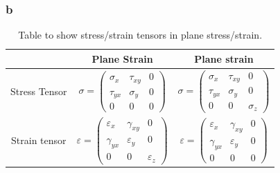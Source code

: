 \documentclass[11pt]{article}
\numberwithin{equation}{section}
\begin{document}
\subsubsection{b}
\begin{table}[H]
    \begin{center}
        \begin{tabular}{ c c c }
            \toprule
                          & Plane Strain                              & Plane strain                              \\
            \midrule
            Stress Tensor & $\sigma = \begin{pmatrix}
                    \sigma_x  & \tau_{xy} & 0 \\
                    \tau_{yx} & \sigma_y  & 0 \\
                    0         & 0         & 0
                \end{pmatrix}$      & $\sigma = \begin{pmatrix}
                    \sigma_x  & \tau_{xy} & 0        \\
                    \tau_{yx} & \sigma_y  & 0        \\
                    0         & 0         & \sigma_z
                \end{pmatrix}$      \\
            Strain tensor & $\varepsilon = \begin{pmatrix}
                    \varepsilon_x & \gamma_{xy}   & 0             \\
                    \gamma_{yx}   & \varepsilon_y & 0             \\
                    0             & 0             & \varepsilon_z
                \end{pmatrix}$ & $\varepsilon = \begin{pmatrix}
                    \varepsilon_x & \gamma_{xy}   & 0 \\
                    \gamma_{yx}   & \varepsilon_y & 0 \\
                    0             & 0             & 0
                \end{pmatrix}$ \\
            \bottomrule
        \end{tabular}
        \caption{Table to show stress/strain tensors in plane stress/strain.}
    \end{center}
\end{table}
\end{document}
